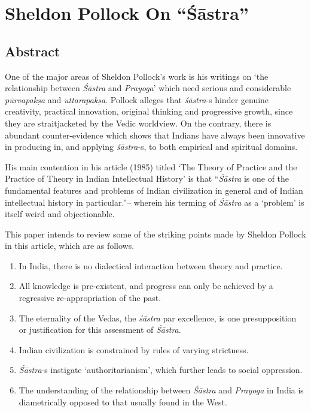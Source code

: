 \chapter{Sheldon Pollock On ``Śāstra''}\label{chapter9}
\vskip -10pt

\vskip -10pt

\section*{Abstract}

One of the major areas of Sheldon Pollock's work is his writings on `the relationship between {\sl Śāstra} and {\sl Prayoga}' which need serious and considerable {\sl pūrvapakṣa} and {\sl uttarapakṣa}. Pollock alleges that {\sl śāstra}-s hinder genuine creativity, practical innovation, original thinking and progressive growth, since they are straitjacketed by the Vedic worldview. On the contrary, there is abundant counter-evidence which shows that Indians have always been innovative in producing in, and applying {\sl śāstra}-s, to both empirical and spiritual domains. 


His main contention in his article (1985) titled `The Theory of Practice and the Practice of Theory in Indian Intellectual History' is that ``{\sl Śāstra} is one of the fundamental features and problems of Indian civilization in general and of Indian intellectual history in particular.''-- wherein his terming of {\sl Śāstra} as a `problem' is itself weird and objectionable.  

This paper intends to review some of the striking points made by Sheldon Pollock in this article, which are as follows.
\begin{enumerate}
\item In India, there is no dialectical interaction between theory and practice.

\item All knowledge is pre-existent, and progress can only be achieved by a regressive re-appropriation of the past.

\item The eternality of the Vedas, the {\sl śāstra} par excellence, is one presupposition or justification for this assessment of {\sl Śāstra}.

\item Indian civilization is constrained by rules of varying strictness.

\item {\sl Śāstra}-s instigate `authoritarianism', which further leads to social oppression.

\item The understanding of the relationship between {\sl Śāstra} and {\sl Prayoga} in India is  diametrically opposed to that usually found in the West. 
\end{enumerate}

